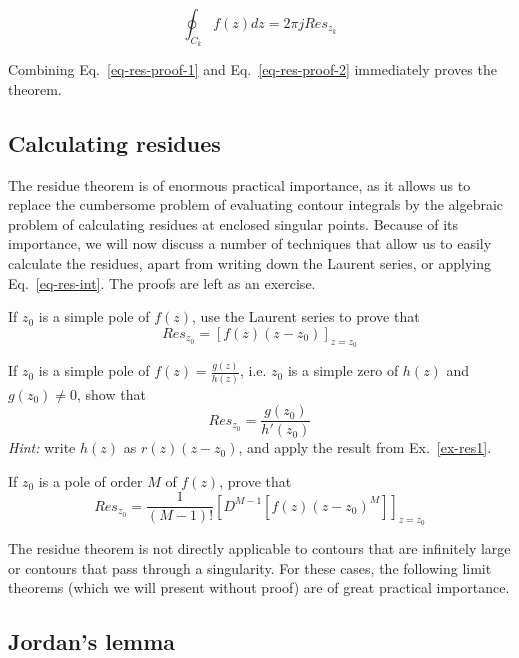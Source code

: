 \begin{equation}
\oint_{{C}_k} f(z) dz = 2 \pi j Res_{z_k} \label{eq-res-proof-2}
\end{equation} 

Combining Eq.~\ref{eq-res-proof-1} and Eq.~\ref{eq-res-proof-2} immediately
proves the theorem.

\subsection*{Calculating residues}

The residue theorem is of enormous practical importance, as it allows us to
replace the cumbersome problem of evaluating contour integrals by the algebraic
problem of calculating residues at enclosed singular points. Because of its
importance, we will now discuss a number of techniques that allow us to easily
calculate the residues, apart from writing down the Laurent series, or applying
Eq.~\ref{eq-res-int}. The proofs are left as an exercise.

\begin{exer}
If $z_0$ is a simple pole of $f(z)$, use the Laurent series to prove that
$$Res_{z_0} = \left[f(z)(z-z_0)\right]_{z=z_0}$$ \label{ex-res1}
\end{exer}

\begin{exer}
If $z_0$ is a simple pole of $f(z)=\frac{g(z)}{h(z)}$, i.e. $z_0$ is a simple zero of $h(z)$ and $g(z_0) \ne 0$, show that
$$Res_{z_0} = \frac{g(z_0)}{h'(z_0)}$$
\emph{Hint:} write $h(z)$ as $r(z)(z-z_0)$, and apply the result from Ex.~\ref{ex-res1}.
\end{exer}

\begin{exer}
If $z_0$ is a pole of order $M$ of $f(z)$, prove that
$$Res_{z_0} = \frac{1}{(M-1)!}{\left[D^{M-1}[f(z)(z-z_0)^M]\right]}_{z=z_0}$$
\end{exer}



The residue theorem is not directly applicable to contours that are infinitely
large or contours that pass through a singularity. For these cases, the
following limit theorems (which we will present without proof) are of great
practical importance.

\subsection*{Jordan's lemma}


